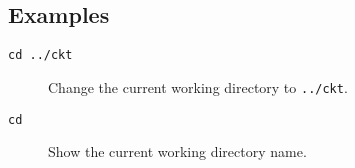 \subsection{Examples}

\begin{description}

\item[{\tt cd ../ckt}] Change the current working directory to {\tt ../ckt}.

\item[{\tt cd}] Show the current working directory name.

\end{description}
